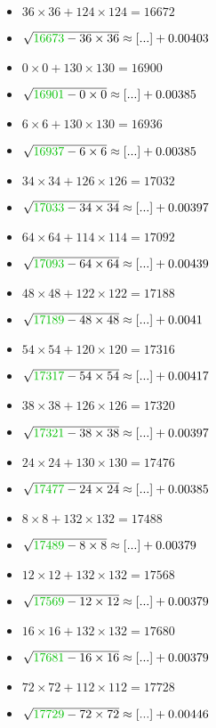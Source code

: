 \documentclass[12pt]{article}
\begin{document}
\begin{multicols}{2}
\begin{itemize}
\item $36\times36 + 124\times124 = 16672$
\item $\sqrt{ {\color{green!75!black}{16673}} - 36\times 36 } \approx [...] + 0.00403$
\item $0\times0 + 130\times130 = 16900$
\item $\sqrt{ {\color{green!75!black}{16901}} - 0\times 0 } \approx [...] + 0.00385$
\item $6\times6 + 130\times130 = 16936$
\item $\sqrt{ {\color{green!75!black}{16937}} - 6\times 6 } \approx [...] + 0.00385$
\item $34\times34 + 126\times126 = 17032$
\item $\sqrt{ {\color{green!75!black}{17033}} - 34\times 34 } \approx [...] + 0.00397$
\item $64\times64 + 114\times114 = 17092$
\item $\sqrt{ {\color{green!75!black}{17093}} - 64\times 64 } \approx [...] + 0.00439$
\item $48\times48 + 122\times122 = 17188$
\item $\sqrt{ {\color{green!75!black}{17189}} - 48\times 48 } \approx [...] + 0.0041$
\item $54\times54 + 120\times120 = 17316$
\item $\sqrt{ {\color{green!75!black}{17317}} - 54\times 54 } \approx [...] + 0.00417$
\item $38\times38 + 126\times126 = 17320$
\item $\sqrt{ {\color{green!75!black}{17321}} - 38\times 38 } \approx [...] + 0.00397$
\item $24\times24 + 130\times130 = 17476$
\item $\sqrt{ {\color{green!75!black}{17477}} - 24\times 24 } \approx [...] + 0.00385$
\item $8\times8 + 132\times132 = 17488$
\item $\sqrt{ {\color{green!75!black}{17489}} - 8\times 8 } \approx [...] + 0.00379$
\item $12\times12 + 132\times132 = 17568$
\item $\sqrt{ {\color{green!75!black}{17569}} - 12\times 12 } \approx [...] + 0.00379$
\item $16\times16 + 132\times132 = 17680$
\item $\sqrt{ {\color{green!75!black}{17681}} - 16\times 16 } \approx [...] + 0.00379$
\item $72\times72 + 112\times112 = 17728$
\item $\sqrt{ {\color{green!75!black}{17729}} - 72\times 72 } \approx [...] + 0.00446$

\end{itemize}
\end{multicols}
\end{document}
